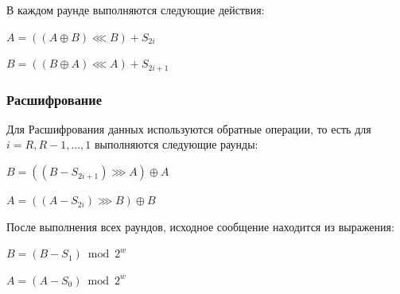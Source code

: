 \documentclass[a4paper]{report}
\begin{document}
В каждом раунде выполняются следующие действия: 

$A=((A\oplus B)\lll B)+S_{2i}$

$B=((B\oplus A)\lll A)+S_{2i+1}$

\subsubsection{Расшифрование}

Для Расшифрования данных используются обратные операции, то есть для $i = R, R − 1,...,1$ выполняются следующие раунды:

$B=((B-S_{2i+1})\ggg A)\oplus A$

$A=((A-S_{2i})\ggg B)\oplus B$

После выполнения всех раундов, исходное сообщение находится из выражения: 

$B=(B-S_1)\bmod {2^{w}}$

$A=(A-S_0)\bmod {2^{w}}$
\end{document}
